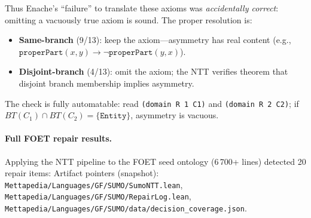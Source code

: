 \documentclass[11pt]{article}
\theoremstyle{definition}
\theoremstyle{plain}
\begin{document}
Thus Enache's ``failure'' to translate these axioms was
\emph{accidentally correct}: omitting a vacuously true axiom is
sound.  The proper resolution is:
\begin{itemize}[nosep]
  \item \textbf{Same-branch} (9/13): keep the axiom---asymmetry has
    real content (e.g., $\texttt{properPart}(x,y) \to
    \lnot\texttt{properPart}(y,x)$).
  \item \textbf{Disjoint-branch} (4/13): omit the axiom; the NTT verifies
    theorem that disjoint branch membership implies asymmetry.
\end{itemize}
The check is fully automatable: read \texttt{(domain R 1 C1)} and
\texttt{(domain R 2 C2)}; if $\mathit{BT}(C_1) \cap
\mathit{BT}(C_2) = \{\texttt{Entity}\}$, asymmetry is vacuous.

\paragraph{Full FOET repair results.}
Applying the NTT pipeline to the FOET seed ontology
(6\,700+ lines) detected 20 repair items:
Artifact pointers (snapshot): \texttt{Mettapedia/Languages/GF/SUMO/SumoNTT.lean},
\texttt{Mettapedia/Languages/GF/SUMO/RepairLog.lean},
\texttt{Mettapedia/Languages/GF/SUMO/data/decision\_coverage.json}.
\end{document}
